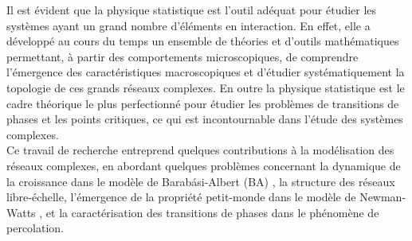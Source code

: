 Il est évident que la physique statistique est l'outil adéquat pour étudier les systèmes ayant un grand nombre d'éléments en interaction. En effet, elle a développé au cours du temps un ensemble de théories et d'outils mathématiques permettant, à partir des comportements microscopiques, de comprendre l'émergence des caractéristiques macroscopiques et d’étudier systématiquement la topologie de ces grands réseaux complexes. En outre la physique statistique est le cadre théorique le plus perfectionné pour étudier les problèmes de transitions de phases et les points critiques, ce qui est incontournable dans l'étude des systèmes complexes. \\


Ce travail de recherche entreprend quelques contributions à la modélisation des réseaux complexes, en abordant quelques problèmes concernant la dynamique de la croissance dans le modèle de Barabási-Albert (BA) \cite{BA1999}, la structure des réseaux  libre-échelle, l'émergence de la propriété petit-monde dans le modèle de Newman-Watts \cite{Newman-Watts1999-2}, et la caractérisation des transitions de phases dans le phénomène de  percolation.

